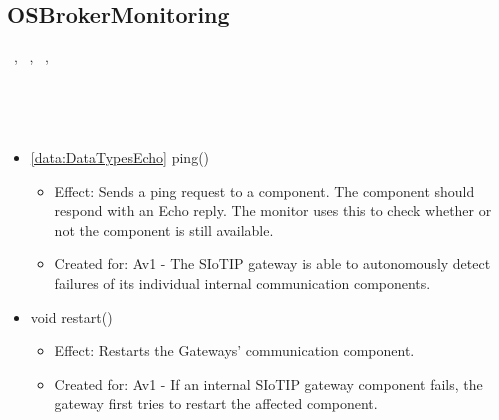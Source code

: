   \subsection{OSBrokerMonitoring}\label{int:GatewayGatewayOnlineServiceBrokerMonitorOSBrokerMonitoring}
    \begin{description}
      \item[Provided by:] \iconcomponent{}~, \iconcomponent{}~, \iconcomponent{}~, \iconcomponent{}~
      \item[Required by:] \iconcomponent{}~
      \item[Operations:] ~
    \begin{itemize}[noitemsep,nolistsep,leftmargin=-.25cm]
      \item \textsf{\ref{data:DataTypesEcho} ping()}
        \begin{itemize}[noitemsep,nolistsep]
           \item Effect: Sends a ping request to a component. The component should respond with an Echo reply. The monitor uses this to check whether or not the component is still available.
\item Created for: Av1 - The SIoTIP gateway is able to autonomously detect failures of its individual internal communication components.
        \end{itemize}
      \item \textsf{void restart()}
        \begin{itemize}[noitemsep,nolistsep]
           \item Effect: Restarts the Gateways' communication component.
\item Created for: Av1 - If an internal SIoTIP gateway component fails, the gateway first tries to restart the affected component.
        \end{itemize}
    \end{itemize}
    \end{description}

